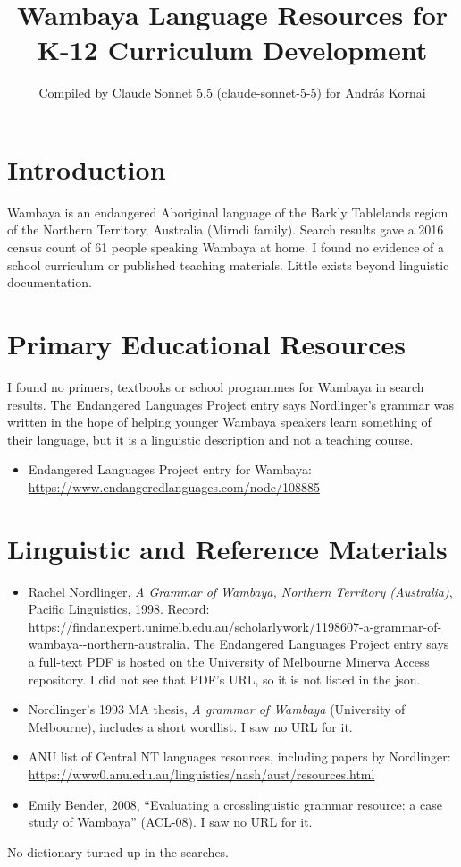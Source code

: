 \documentclass[12pt]{article}
\title{Wambaya Language Resources for K-12 Curriculum Development}
\author{Compiled by Claude Sonnet 5.5 (claude-sonnet-5-5) for Andr\'as Kornai}
\date{}
\begin{document}
\maketitle

\section{Introduction}
Wambaya is an endangered Aboriginal language of the Barkly Tablelands region of the Northern Territory, Australia (Mirndi family). Search results gave a 2016 census count of 61 people speaking Wambaya at home. I found no evidence of a school curriculum or published teaching materials. Little exists beyond linguistic documentation.

\section{Primary Educational Resources}
I found no primers, textbooks or school programmes for Wambaya in search results. The Endangered Languages Project entry says Nordlinger's grammar was written in the hope of helping younger Wambaya speakers learn something of their language, but it is a linguistic description and not a teaching course.
\begin{itemize}
\item Endangered Languages Project entry for Wambaya: \url{https://www.endangeredlanguages.com/node/108885}
\end{itemize}

\section{Linguistic and Reference Materials}
\begin{itemize}
\item Rachel Nordlinger, \emph{A Grammar of Wambaya, Northern Territory (Australia)}, Pacific Linguistics, 1998. Record: \url{https://findanexpert.unimelb.edu.au/scholarlywork/1198607-a-grammar-of-wambaya--northern-australia}. The Endangered Languages Project entry says a full-text PDF is hosted on the University of Melbourne Minerva Access repository. I did not see that PDF's URL, so it is not listed in the json.
\item Nordlinger's 1993 MA thesis, \emph{A grammar of Wambaya} (University of Melbourne), includes a short wordlist. I saw no URL for it.
\item ANU list of Central NT languages resources, including papers by Nordlinger: \url{https://www0.anu.edu.au/linguistics/nash/aust/resources.html}
\item Emily Bender, 2008, ``Evaluating a crosslinguistic grammar resource: a case study of Wambaya'' (ACL-08). I saw no URL for it.
\end{itemize}
No dictionary turned up in the searches.
\end{document}

